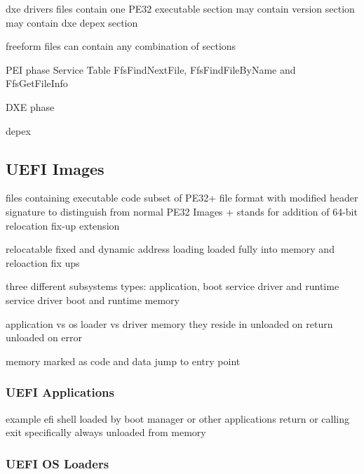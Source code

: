 dxe drivers files
contain one PE32 executable section
may contain version section
may contain dxe depex section

freeform files
can contain any combination of sections

PEI phase Service Table
FfsFindNextFile, FfsFindFileByName and FfsGetFileInfo

DXE phase

depex

\cite{tianocore-edk2-build-spec}

\subsection{\acs{UEFI} Images}


files containing executable code
subset of PE32+ file format with modified header signature to distinguish from normal PE32 Images
+ stands for addition of 64-bit relocation fix-up extension

relocatable
fixed and dynamic address loading
loaded fully into memory and reloaction fix ups

three different subsystems types: application, boot service driver and runtime service driver
boot and runtime memory

application vs os loader vs driver
memory they reside in
unloaded on return
unloaded on error

memory marked as code and data
jump to entry point

\subsubsection{\acs{UEFI} Applications}


example efi shell
loaded by boot manager or other applications
return or calling exit specifically
always unloaded from memory

\subsubsection{UEFI OS Loaders}


